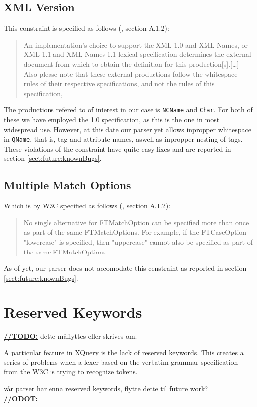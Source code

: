 \subsection{XML Version}
\label{sect:implementation:xmlVersion}
This constraint is specified as follows (\cite{w3c00}, section A.1.2):
\begin{quote}
An implementation's choice to support the XML 1.0 and XML Names, or XML 1.1 and XML Names 1.1 lexical specification determines the external document from which to obtain the definition for this production[s].[\ldots] Also please note that these external productions follow the whitespace rules of their respective specifications, and not the rules of this specification,
\end{quote}

The productions refered to of interest in our case is \verb!NCName! and \verb!Char!. For both of these we have employed the 1.0 specification, as this is the one in most widespread use. However, at this date our parser yet allows inpropper whitespace in \verb!QName!, that is, tag and attribute names, aswell as inpropper nesting of tags. These violations of the constraint have quite easy fixes and are reported in section \ref{sect:future:knownBugs}.

\subsection{Multiple Match Options}
\label{sect:implementation:multipleMatchOptions}
Which is by W3C specified as follows (\cite{w3c00}, section A.1.2):
\begin{quote}
No single alternative for FTMatchOption can be specified more than once as part of the same FTMatchOptions. For example, if the FTCaseOption "lowercase" is specified, then "uppercase" cannot also be specified as part of the same FTMatchOptions.
\end{quote}

As of yet, our parser does not accomodate this constraint as reported in section \ref{sect:future:knownBugs}.

\section{Reserved Keywords}

\underline{\textbf{\LARGE //TODO:}} dette m\aa flyttes eller skrives om.

A particular feature in XQuery is the lack of reserved keywords. This creates a
series of problems when a lexer based on the verbatim grammar specification from
the W3C is trying to recognize tokens. 

v\aa r parser har enna reserved keywords, flytte dette til future work? \\
\underline{\textbf{\LARGE //ODOT:}} 



